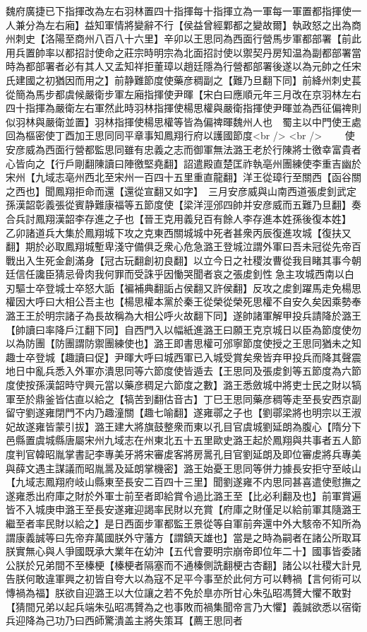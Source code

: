 魏府廣捷已下指揮改為左右羽林置四十指揮每十指揮立為一軍每一軍置都指揮使一人兼分為左右廂】益知軍情將變辭不行【侯益曾經鄴都之變故爾】執政怒之出為商州刺史【洛陽至商州八百八十六里】辛卯以王思同為西面行營馬步軍都部署【前此用兵置帥率以都招討使命之莊宗時明宗為北面招討使以禦契丹房知温為副都部署當時為都部署者必有其人又孟知祥拒董璋以趙廷隱為行營都部署後遂以為元帥之任宋氏建國之初猶因而用之】前静難節度使藥彦稠副之【難乃旦翻下同】前絳州刺史萇從簡為馬步都虞候嚴衛步軍左廂指揮使尹暉【宋白曰應順元年三月改在京羽林左右四十指揮為嚴衛左右軍然此時羽林指揮使楊思權與嚴衛指揮使尹暉並為西征偏禆則似羽林與嚴衛並置】羽林指揮使楊思權等皆為偏禆暉魏州人也　蜀主以中門使王處回為樞密使丁酉加王思同同平章事知鳳翔行府以護國節度<br />
<br />
　　使安彦威為西面行營都監思同雖有忠義之志而御軍無法潞王老於行陳將士徼幸富貴者心皆向之【行戶剛翻陳讀曰陣徼堅堯翻】詔遣殿直楚匡祚執亳州團練使李重吉幽於宋州【九域志亳州西北至宋州一百四十五里重直龍翻】洋王從璋行至關西【函谷關之西也】聞鳳翔拒命而還【還從宣翻又如字】　三月安彦威與山南西道張䖍釗武定孫漢韶彰義張從賓静難康福等五節度使【梁洋涇邠四帥并安彦威而五難乃旦翻】奏合兵討鳳翔漢韶李存進之子也【晉王克用義兒百有餘人李存進本姓孫後復本姓】　乙卯諸道兵大集於鳳翔城下攻之克東西關城城中死者甚衆丙辰復進攻城【復扶又翻】期於必取鳳翔城塹卑淺守備俱乏衆心危急潞王登城泣謂外軍曰吾未冠從先帝百戰出入生死金創滿身【冠古玩翻創初良翻】以立今日之社稷汝曹從我目睹其事今朝廷信任讒臣猜忌骨肉我何罪而受誅乎因慟哭聞者哀之張䖍釗性急主攻城西南以白刃驅士卒登城士卒怒大詬【褊補典翻詬占侯翻又許侯翻】反攻之䖍釗躍馬走免楊思權因大呼曰大相公吾主也【楊思權本黨於秦王從榮從榮死思權不自安久矣因乘勢奉潞王王於明宗諸子為長故稱為大相公呼火故翻下同】遂帥諸軍解甲投兵請降於潞王【帥讀曰率降戶江翻下同】自西門入以幅紙進潞王曰願王克京城日以臣為節度使勿以為防團【防團謂防禦團練使也】潞王即書思權可邠寧節度使授之王思同猶未之知趣士卒登城【趣讀曰促】尹暉大呼曰城西軍已入城受賞矣衆皆弃甲投兵而降其聲震地日中亂兵悉入外軍亦潰思同等六節度使皆遁去【王思同及張䖍釗等五節度為六節度使按孫漢韶時守興元當以藥彦稠足六節度之數】潞王悉斂城中將吏士民之財以犒軍至於鼎釜皆估直以給之【犒苦到翻估音古】丁巳王思同藥彦稠等走至長安西京副留守劉遂雍閉門不内乃趣潼關【趣七喻翻】遂雍鄩之子也【劉鄩梁將也明宗以王淑妃故遂雍皆蒙引拔】潞王建大將旗鼓整衆而東以孔目官虞城劉延朗為腹心【隋分下邑縣置虞城縣唐屬宋州九域志在州東北五十五里歐史潞王起於鳳翔與共事者五人節度判官韓昭胤掌書記李專美牙將宋審䖍客將房暠孔目官劉延朗及即位審䖍將兵專美與薛文遇主謀議而昭胤暠及延朗掌機密】潞王始憂王思同等併力據長安拒守至岐山【九域志鳳翔府岐山縣東至長安二百四十三里】聞劉遂雍不内思同甚喜遣使慰撫之遂雍悉出府庫之財於外軍士前至者即給賞令過比潞王至【比必利翻及也】前軍賞遍皆不入城庚申潞王至長安遂雍迎謁率民財以充賞【府庫之財僅足以給前軍其隨潞王繼至者率民財以給之】是日西面步軍都監王景從等自軍前奔還中外大駭帝不知所為謂康義誠等曰先帝弃萬國朕外守藩方【謂鎮天雄也】當是之時為嗣者在諸公所取耳朕實無心與人爭國既承大業年在幼沖【五代會要明宗崩帝即位年二十】國事皆委諸公朕於兄弟間不至榛梗【榛梗者隔塞而不通榛側詵翻梗古杏翻】諸公以社稷大計見告朕何敢違軍興之初皆自夸大以為寇不足平今事至於此何方可以轉禍【言何術可以慱禍為福】朕欲自迎潞王以大位讓之若不免於臯亦所甘心朱弘昭馮贇大懼不敢對【猜間兄弟以起兵端朱弘昭馮贇為之也事敗而禍集聞帝言乃大懼】義誠欲悉以宿衛兵迎降為己功乃曰西師驚潰盖主將失策耳【薦王思同者